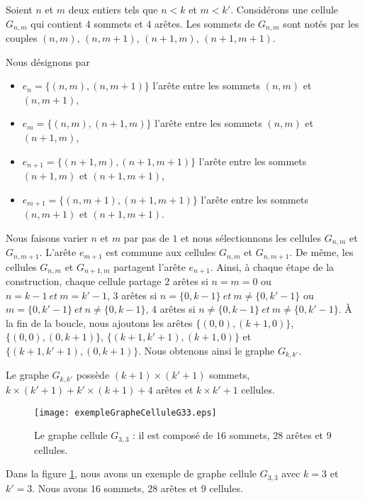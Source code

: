 
Soient $n$ et $m$ deux entiers tels que $n < k$ et $m < k'$.
Consid\'erons une cellule $G_{n,m}$ qui contient $4$ sommets et $4$ ar\^etes.
Les sommets de  $G_{n,m}$  sont not\'es par les couples $(n,m)$, $(n,m+1)$, $(n+1,m)$,  $(n+1,m+1)$. 

Nous d\'esignons par 
\begin{itemize}
\item $e_{n} = \{(n,m),(n,m+1)\}$ l'ar\^ete entre les sommets $(n,m)$ et $(n,m+1)$,   
\item $e_{m} = \{(n,m),(n+1,m)\}$ l'ar\^ete entre les sommets $(n,m)$ et $(n+1,m)$,   
\item $e_{n+1} = \{(n+1,m),(n+1,m+1)\}$ l'ar\^ete entre les sommets $(n+1,m)$ et $(n+1,m+1)$,   
\item $e_{m+1} = \{(n,m+1),(n+1,m+1)\}$ l'ar\^ete entre les sommets $(n,m+1)$ et $(n+1,m+1)$.
\end{itemize}
Nous faisons varier $n$ et $m$ par pas de $1$ et nous s\'electionnons les cellules $G_{n,m}$ et $G_{n,m+1}$.
L'ar\^ete $e_{m+1}$ est commune aux cellules $G_{n,m}$ et $G_{n,m+1}$. 
De m\^eme, les cellules $G_{n,m}$ et $G_{n+1,m}$ partagent l'ar\^ete $e_{n+1}$. 
Ainsi, \`a chaque \'etape de la construction, chaque cellule partage 
$2$ ar\^etes si $n = m = 0$ ou $n = k-1 ~et~ m = k'-1$,
$3$ ar\^etes si $n = \{0,k-1\} ~et~ m \neq \{0,k'-1\}$ ou $m = \{0,k'-1\} ~et~ n \neq \{0,k-1\}$, 
$4$ ar\^etes si $n \neq \{0,k-1\} ~et~ m \neq \{0,k'-1\}$. 
\newline
\`A la fin de la boucle, nous ajoutons les ar\^etes $\{(0,0),(k+1,0)\}$, $\{(0,0),(0,k+1)\}$, $\{(k+1,k'+1),(k+1,0)\}$ et $\{(k+1,k'+1),(0,k+1)\}$.
Nous obtenons ainsi le graphe $G_{k,k'}$.

\begin{definition}
Le graphe $G_{k,k'}$ poss\`ede $(k+1) \times (k'+1)$ sommets,  $k \times (k'+1) + k' \times(k+1) + 4$  ar\^etes et $k \times k' +1$ cellules.
\end{definition}

\begin{figure}[htb!] 
\centering
\texttt{[image: exempleGrapheCelluleG33.eps]}
\caption{ Le graphe cellule $G_{3,3}$ : il est compos\'e de $16$ sommets, $28$ ar\^etes et $9$ cellules. }
\label{exempleGrapheCellule} 
\end{figure}

Dans la figure \ref{exempleGrapheCellule}, nous avons un exemple de graphe cellule $G_{3,3}$ avec $k=3$ et $k'=3$. Nous avons $16$ sommets, $28$ ar\^etes et $9$ cellules. 